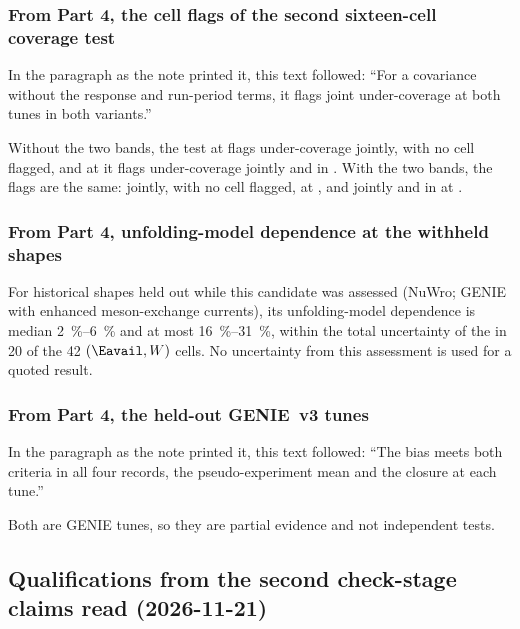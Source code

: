 \subsubsection{From Part 4, the cell flags of the second sixteen-cell coverage test}
In the paragraph as the note printed it, this text followed: ``For a covariance without the response and run-period terms, it flags joint under-coverage at both tunes in both variants.''\par
Without the two bands, the test at  flags under-coverage jointly, with no cell flagged, and at  it flags under-coverage jointly and in . With the two bands, the flags are the same: jointly, with no cell flagged, at , and jointly and in  at .

\subsubsection{From Part 4, unfolding-model dependence at the withheld shapes}
For historical shapes held out while this candidate was assessed (NuWro; GENIE with enhanced meson-exchange currents), its unfolding-model dependence is median \SIrange{2}{6}{\percent} and at most \SIrange{16}{31}{\percent}, within the total uncertainty of the \resFiveAxis{} in 20 of the 42 $(\Eavail,W)$ cells. No uncertainty from this assessment is used for a quoted result.

\subsubsection{From Part 4, the held-out GENIE~v3 tunes}
In the paragraph as the note printed it, this text followed: ``The bias meets both criteria in all four records, the pseudo-experiment mean and the closure at each tune.''\par
Both are GENIE tunes, so they are partial evidence and not independent tests.

\subsection{Qualifications from the second check-stage claims read (2026-11-21)}

